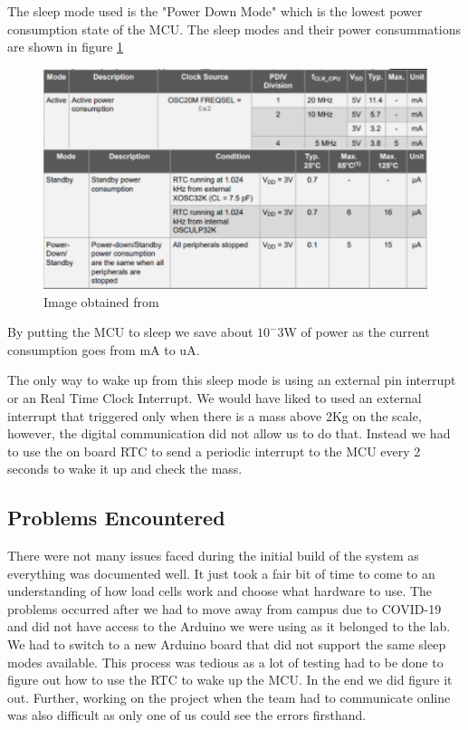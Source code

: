 \documentclass[letterpaper,11pt]{article}
\newcommand{\myLink}[2]{\href{#1}{\color{blue}\underline{\smash{\texttt{#2}}}}}
\begin{document}
The sleep mode used is the "Power Down Mode" which is the lowest power
consumption state of the MCU. The sleep modes and their power consummations are
shown in figure \ref{img:sleep}

\begin{figure}[h]
  \centering
  \includegraphics[width=1.0\textwidth]{powermodes}
  \caption{Image obtained from \myLink{http://ww1.microchip.com/downloads/en/DeviceDoc/ATmega4808-4809-Data-Sheet-DS40002173A.pdf}{ATMEGA 4809 Datasheet}}
  \label{img:sleep}
\end{figure}

By putting the MCU to sleep we save about $10^-3$W of power as the current
consumption goes from mA to uA.

The only way to wake up from this sleep mode is using an external pin interrupt
or an Real Time Clock Interrupt. We would have liked to used an external
interrupt that triggered only when there is a mass above 2Kg on the scale,
however, the digital communication did not allow us to do that. Instead we had
to use the on board RTC to send a periodic interrupt to the MCU every 2 seconds
to wake it up and check the mass.

\subsection{Problems Encountered}

There were not many issues faced during the initial build of the system as
everything was documented well. It just took a fair bit of time to come to an
understanding of how load cells work and choose what hardware to use. The
problems occurred after we had to move away from campus due to COVID-19 and did
not have access to the Arduino we were using as it belonged to the lab. We had
to switch to a new Arduino board that did not support the same sleep modes
available. This process was tedious as a lot of testing had to be done to figure
out how to use the RTC to wake up the MCU. In the end we did figure it
out. Further, working on the project when the team had to communicate online was
also difficult as only one of us could see the errors firsthand.
\end{document}
